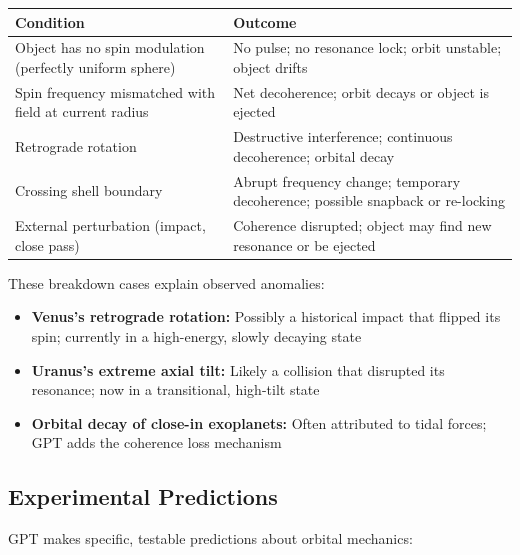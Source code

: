 \documentclass[12pt, a4paper]{article}
\begin{document}
\begin{center}
\begin{tabular}{|p{6cm}|p{8cm}|}
\hline
\textbf{Condition} & \textbf{Outcome} \\
\hline
Object has no spin modulation (perfectly uniform sphere) & No pulse; no resonance lock; orbit unstable; object drifts \\
\hline
Spin frequency mismatched with field at current radius & Net decoherence; orbit decays or object is ejected \\
\hline
Retrograde rotation & Destructive interference; continuous decoherence; orbital decay \\
\hline
Crossing shell boundary & Abrupt frequency change; temporary decoherence; possible snapback or re-locking \\
\hline
External perturbation (impact, close pass) & Coherence disrupted; object may find new resonance or be ejected \\
\hline
\end{tabular}
\end{center}

These breakdown cases explain observed anomalies:
\begin{itemize}
    \item \textbf{Venus's retrograde rotation:} Possibly a historical impact that flipped its spin; currently in a high-energy, slowly decaying state
    \item \textbf{Uranus's extreme axial tilt:} Likely a collision that disrupted its resonance; now in a transitional, high-tilt state
    \item \textbf{Orbital decay of close-in exoplanets:} Often attributed to tidal forces; GPT adds the coherence loss mechanism
\end{itemize}

\subsection{Experimental Predictions}
\label{subsec:orbital_predictions}

GPT makes specific, testable predictions about orbital mechanics:
\end{document}
